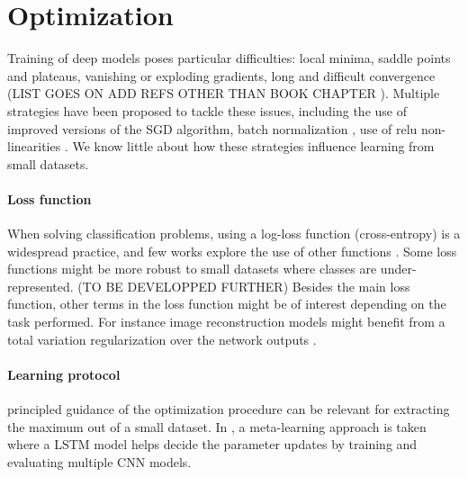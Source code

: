 \documentclass[twocolumn]{article}
\begin{document}
\section{Optimization}

Training of deep models poses particular difficulties: local minima, saddle points and plateaus, vanishing or exploding gradients, long and difficult convergence (LIST GOES ON ADD REFS OTHER THAN BOOK CHAPTER \cite{Goodfellow2016Optimization}). Multiple strategies have been proposed to tackle these issues, including the use of improved versions of the SGD algorithm, batch normalization \cite{Sergey2015Batch}, use of relu non-linearities  \cite{Krizhevsky2012Imagenet, He2015Delving}. 
We know little about how these strategies influence learning from small datasets.


\paragraph*{Loss function} When solving classification problems, using a log-loss function (cross-entropy) is a widespread practice, and few works explore the use of other functions \cite{Janocha2017Loss}. Some loss functions might be more robust to small datasets where classes are under-represented. (TO BE DEVELOPPED FURTHER)
Besides the main loss function, other terms in the loss function might be of interest depending on the task performed. For instance image reconstruction models might benefit from a total variation regularization over the network outputs \cite{Jin2016Deep}. 

\paragraph*{Learning protocol} principled guidance of the optimization procedure can be relevant for extracting the maximum out of a small dataset. In \cite{Ravi2017Optimization}, a meta-learning approach is taken where a LSTM model helps decide the parameter updates by training and evaluating multiple CNN models. 
\end{document}
